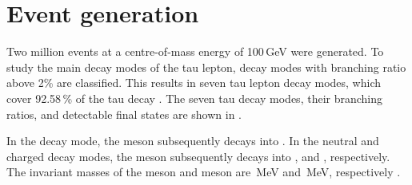 




\section{Event generation}
\label{sec:tauDecayModes}


Two million \eeToTauTau events at a centre-of-mass energy of 100\,GeV were generated. To study the main decay modes of the tau lepton, decay modes with branching ratio above 2\% are classified. This results in seven tau lepton decay modes, which cover 92.58\,\% of the tau decay \cite{Agashe:2014kda}. The seven tau decay modes, their branching ratios, and detectable final states are  shown in .


In the  \decayRho decay mode, the \Prho meson subsequently decays into  \decayRhoFinalStateShort. In the \decayAi  neutral and charged decay modes, the \Pai meson subsequently decays into \decayAiPhotonFinalStateShort, and \decayAiPionFinalStateShort, respectively. The invariant masses of the \Prho meson and \Pai meson are \,MeV and \,MeV, respectively \cite{Agashe:2014kda}.

